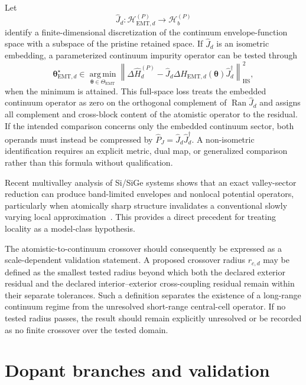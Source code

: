 Let
\begin{equation}
    \hat J_d:
    \mathcal H_{\mathrm{EMT},d}^{(P)}
    \longrightarrow
    \mathcal H_b^{(P)}
\end{equation}
identify a finite-dimensional discretization of the continuum envelope-function
space with a subspace of the pristine retained space. If $\hat J_d$ is an
isometric embedding, a parameterized continuum impurity operator can be tested
through
\begin{equation}
    \boldsymbol\theta_{\mathrm{EMT},d}^{\star}
    \in
    \operatorname*{arg\,min}_{\boldsymbol\theta\in\Theta_{\mathrm{EMT}}}
    \left\lVert
        \Delta\hat H_d^{(P)}
        -
        \hat J_d
        \Delta\hat H_{\mathrm{EMT},d}(\boldsymbol\theta)
        \hat J_d^\dagger
    \right\rVert_{\mathrm{HS}}^2,
\end{equation}
when the minimum is attained. This full-space loss treats the embedded
continuum operator as zero on the orthogonal complement of
$\operatorname{Ran}\hat J_d$ and assigns all complement and cross-block content
of the atomistic operator to the residual. If the intended comparison concerns
only the embedded continuum sector, both operands must instead be compressed by
$\hat P_J=\hat J_d\hat J_d^\dagger$. A non-isometric identification requires an
explicit metric, dual map, or generalized comparison rather than this formula
without qualification.

Recent multivalley analysis of Si/SiGe systems shows that an exact
valley-sector reduction can produce band-limited envelopes and nonlocal
potential operators, particularly when atomically sharp structure invalidates
a conventional slowly varying local approximation~\cite{ermoneit2026}. This
provides a direct precedent for treating locality as a model-class hypothesis.

The atomistic-to-continuum crossover should consequently be expressed as a
scale-dependent validation statement. A proposed crossover radius $r_{c,d}$
may be defined as the smallest tested radius beyond which both the declared
exterior residual and the declared interior--exterior cross-coupling residual
remain within their separate tolerances. Such a definition separates the
existence of a long-range
continuum regime from the unresolved short-range central-cell operator. If no
tested radius passes, the result should remain explicitly unresolved or be
recorded as no finite crossover over the tested domain.

\section*{Dopant branches and validation}


